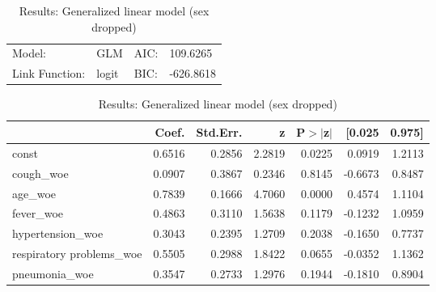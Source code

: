 \begin{table}[H]
	\renewcommand{\arraystretch}{1.25}
	\begin{center}
	\begin{tabular}{llll}
	\hline
	Model:              & GLM              & AIC:            & 109.6265   \\
	Link Function:      & logit            & BIC:            & -626.8618  \\
	\hline
	\end{tabular}
	\end{center}
	\begin{center}
	\begin{tabular}{lrrrrrr}
	\hline
	                          & Coef.  & Std.Err. &   z    & P$> |$z$|$ &  [0.025 & 0.975]  \\
	\hline
	\hline
	const                     & 0.6516 &   0.2856 & 2.2819 &      0.0225 &  0.0919 & 1.2113  \\
	cough\_woe                & 0.0907 &   0.3867 & 0.2346 &      0.8145 & -0.6673 & 0.8487  \\
	age\_woe                  & 0.7839 &   0.1666 & 4.7060 &      0.0000 &  0.4574 & 1.1104  \\
	fever\_woe                & 0.4863 &   0.3110 & 1.5638 &      0.1179 & -0.1232 & 1.0959  \\
	hypertension\_woe         & 0.3043 &   0.2395 & 1.2709 &      0.2038 & -0.1650 & 0.7737  \\
	respiratory problems\_woe & 0.5505 &   0.2988 & 1.8422 &      0.0655 & -0.0352 & 1.1362  \\
	pneumonia\_woe            & 0.3547 &   0.2733 & 1.2976 &      0.1944 & -0.1810 & 0.8904  \\
	\hline
	\end{tabular}
	\end{center}
	\caption{Results: Generalized linear model (sex dropped) \label{table:covid_results_2}}
\end{table}

